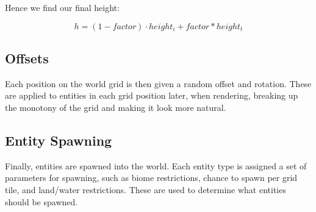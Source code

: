 \documentclass{article}
\begin{document}
\begin{multicols}{2}
        Hence we find our final height:

        \[
            h = (1 - factor) \cdot height_i + factor * height_t
        \]
        
        \subsection{Offsets}
        
        Each position on the world grid is then given a random offset and rotation. These are applied to entities in each grid position later, when rendering, breaking up the monotony of the grid and making it look more natural.
        
        \subsection{Entity Spawning}
        
        Finally, entities are spawned into the world. Each entity type is assigned a set of parameters for spawning, such as biome restrictions, chance to spawn per grid tile, and land/water restrictions. These are used to determine what entities should be spawned.
        

    \end{multicols}

    \newpage
    
\end{document}
